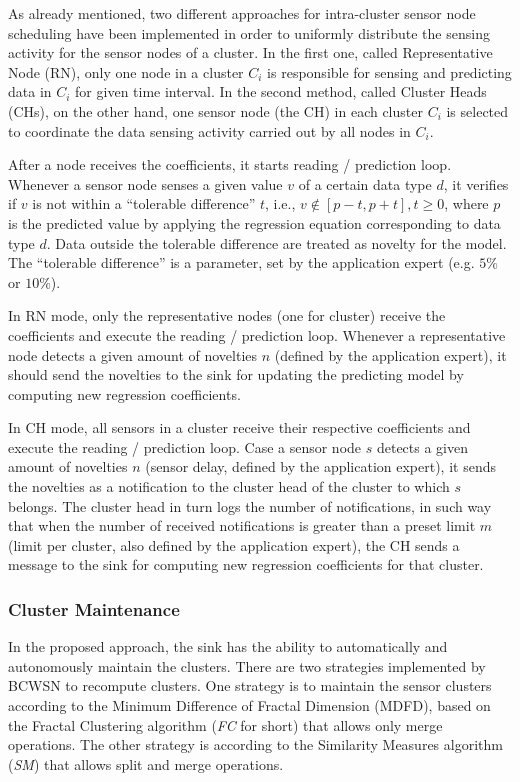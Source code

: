 \documentclass[conference]{IEEEtran}
\begin{document}
As already mentioned, two different approaches for intra-cluster sensor node
scheduling have been implemented in order to uniformly distribute the sensing
activity for the sensor nodes of a cluster. In the first one, called
Representative Node (RN), only one node in a cluster $C_{i}$ is responsible
for sensing and predicting data in $C_{i}$ for given time interval. In the
second method, called Cluster Heads (CHs), on the other hand, one sensor node
(the CH) in each cluster $C_{i}$ is selected to coordinate the data sensing
activity carried out by all nodes in $C_{i}$.

After a node receives the coefficients, it starts reading / prediction loop. 
Whenever a sensor node senses a given value $v$ of a certain data type $d$, it
verifies if $v$ is not within a ``tolerable difference'' $t$, i.e., $v \not \in
[p-t,p+t], t \geq 0$, where $p$ is the predicted value by applying the
regression equation corresponding to data type $d$. Data outside the tolerable
difference are treated as novelty for the model. The ``tolerable difference'' is
a parameter, set by the application expert (e.g. $5\%$ or $10\%$).

In RN mode, only the representative nodes (one for cluster) receive the
coefficients and execute the reading / prediction loop. Whenever a representative
node detects a given amount of novelties $n$ (defined by the application
expert), it should send the novelties to the sink for updating the predicting
model by computing new regression coefficients.

In CH mode, all sensors in a cluster receive their respective coefficients and
execute the reading / prediction loop. Case a sensor node $s$ detects a given
amount of novelties $n$ (sensor delay, defined by the application expert), it
sends the novelties as a notification to the cluster head of the cluster to which $s$ belongs. The cluster head in turn logs the
number of notifications, in such way that when the number of received
notifications is greater than a preset limit $m$ (limit per cluster, also
defined by the application expert), the CH sends a message to the sink for
computing new regression coefficients for that cluster.


\subsubsection{Cluster Maintenance}

In the proposed approach, the sink has the ability to automatically and
autonomously maintain the clusters. There are two strategies implemented by
BCWSN to recompute clusters. One strategy is to maintain the sensor clusters
according to the Minimum Difference of Fractal Dimension (MDFD), based on the
Fractal Clustering algorithm (\textit{FC} for short) that allows only
merge operations. The other strategy is according to the Similarity
Measures algorithm (\textit{SM}) that allows split and merge operations.
\end{document}

